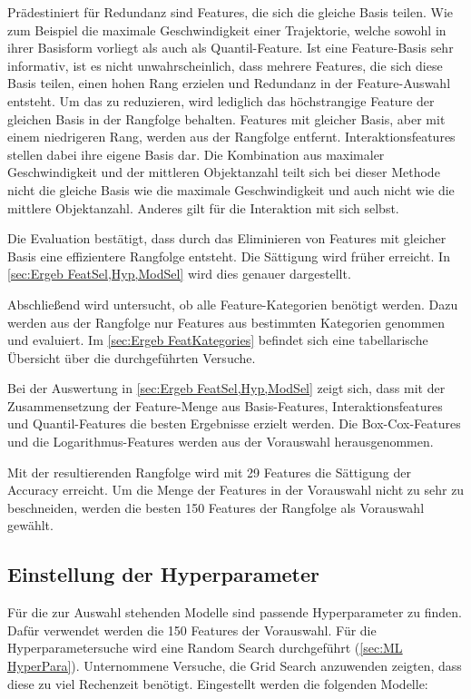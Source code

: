 Prädestiniert für Redundanz sind Features, die sich die gleiche Basis teilen. Wie zum Beispiel die maximale Geschwindigkeit einer Trajektorie, welche sowohl in ihrer Basisform vorliegt als auch als Quantil-Feature. Ist eine Feature-Basis sehr informativ, ist es nicht unwahrscheinlich, dass mehrere Features, die sich diese Basis teilen, einen hohen Rang erzielen und Redundanz in der Feature-Auswahl entsteht. Um das zu reduzieren, wird lediglich das höchstrangige Feature der gleichen Basis in der Rangfolge behalten. Features mit gleicher Basis, aber mit einem niedrigeren Rang,  werden aus der Rangfolge entfernt. Interaktionsfeatures stellen dabei ihre eigene Basis dar. Die Kombination aus maximaler Geschwindigkeit und der mittleren Objektanzahl teilt sich bei dieser Methode nicht die gleiche Basis wie die maximale Geschwindigkeit und auch nicht wie die mittlere Objektanzahl. Anderes gilt für die Interaktion mit sich selbst. \par

Die Evaluation bestätigt, dass durch das Eliminieren von Features mit gleicher Basis eine effizientere Rangfolge entsteht. Die Sättigung wird früher erreicht. In \autoref{sec:Ergeb FeatSel,Hyp,ModSel} wird dies genauer dargestellt. \par

Abschließend wird untersucht, ob alle Feature-Kategorien benötigt werden. Dazu werden aus der Rangfolge nur Features aus bestimmten Kategorien genommen und evaluiert. Im \autoref{sec:Ergeb FeatKategories} befindet sich eine tabellarische Übersicht über die durchgeführten Versuche. \par

Bei der Auswertung in \autoref{sec:Ergeb FeatSel,Hyp,ModSel} zeigt sich, dass mit der Zusammensetzung der Feature-Menge aus Basis-Features, Interaktionsfeatures und Quantil-Features die besten Ergebnisse erzielt werden. Die Box-Cox-Features und die Logarithmus-Features werden aus der Vorauswahl herausgenommen. \par

Mit der resultierenden Rangfolge wird mit 29 Features die Sättigung der Accuracy erreicht. Um die Menge der Features in der Vorauswahl nicht zu sehr zu beschneiden, werden die besten 150 Features der Rangfolge als Vorauswahl gewählt. 



\subsection{Einstellung der Hyperparameter} \label{sec:Meth HyperparaKonf}
Für die zur Auswahl stehenden Modelle sind passende Hyperparameter zu finden. Dafür verwendet werden die 150 Features der Vorauswahl. Für die Hyperparametersuche wird eine Random Search durchgeführt (\autoref{sec:ML HyperPara}). Unternommene Versuche, die Grid Search anzuwenden zeigten, dass diese zu viel Rechenzeit benötigt. Eingestellt werden die folgenden Modelle:

